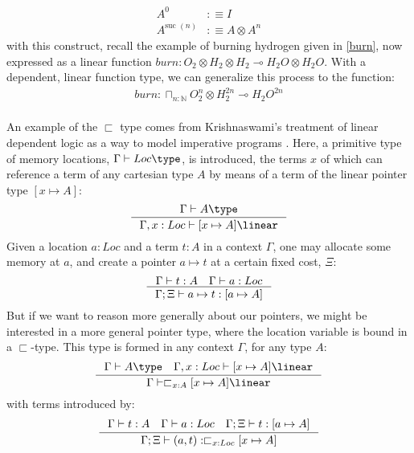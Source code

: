 \[
  \begin{split}
  A^0 &:\equiv I\\
  A^{\text{suc }(n)} &:\equiv A \otimes A^n
  \end{split}
\]
with this construct, recall the example of burning hydrogen given in \ref{burn}, now expressed as a linear function $burn : O_2 \otimes H_2 \otimes H_2 \multimap H_2O \otimes H_2O$. With a dependent, linear function type, we can generalize this process to the function:
\[
  \begin{split}
  burn : \sqcap_{n : \mathbb{N}}O_2^n \otimes H_2^{2n} \multimap H_2O^{2n}
  \end{split}
\]
\\
An example of the $\sqsubset$ type comes from Krishnaswami's treatment of linear dependent logic as a way to model imperative programs \cite{krishnaswami}. Here, a primitive type of memory locations, $\Gamma \vdash Loc \type$, is introduced, the terms $x$ of which can reference a term of any cartesian type $A$ by means of a term of the linear pointer type $[x \mapsto A]$:
\[ 
  \inference{\Gamma \vdash A \type}
  {\Gamma, x : Loc \vdash [x \mapsto A] \linear}
\]
Given a location $a : Loc$ and a term $t : A$ in a context $\Gamma$, one may allocate some memory at $a$, and create a pointer $a \mapsto t$ at a certain fixed cost, $\Xi$:
\[
  \inference{\Gamma \vdash t : A \quad \Gamma \vdash a : Loc}
  {\Gamma; \Xi \vdash a \mapsto t : [a \mapsto A]}
\]
But if we want to reason more generally about our pointers, we might be interested in a more general pointer type, where the location variable is bound in a $\sqsubset$-type. This type is formed in any context $\Gamma$, for any type $A$:
\[
  \inference{\Gamma \vdash A \type \quad \Gamma, x : Loc \vdash [x \mapsto A] \linear} 
  {\Gamma \vdash \sqsubset_{x : A}[x \mapsto A] \linear}
\]
with terms introduced by:
\[
  \inference{\Gamma \vdash t : A \quad \Gamma \vdash a : Loc \quad \Gamma; \Xi \vdash t : [a \mapsto A]}
  {\Gamma; \Xi \vdash (a, t) : \sqsubset_{x : Loc} [x \mapsto A]}
\]


